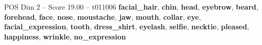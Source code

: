 \begin{textsample}{POS Dim 2 – Score 19.00 – t011006}  \label{ex:f2_pos_035}
\textbf{facial\_hair}, \textbf{chin}, \textbf{head}, \textbf{eyebrow}, \textbf{beard}, \textbf{forehead}, \textbf{face}, \textbf{nose}, \textbf{moustache}, \textbf{jaw}, \textbf{mouth}, \textbf{collar}, \textbf{eye}, \textbf{facial\_expression}, \textbf{tooth}, \textbf{dress\_shirt}, \textbf{eyelash}, \textbf{selfie}, \textbf{necktie}, \textbf{pleased}, \textbf{happiness}, \textbf{wrinkle}, \textbf{no\_expression}

\end{textsample}
